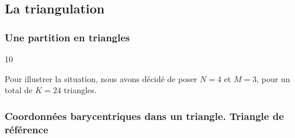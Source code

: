 \subsection{La triangulation}

\subsubsection{Une partition en triangles}

\begin{reponse}{10}

Pour illustrer la situation, nous avons décidé de poser $N=4$ et $M=3$, pour un total de $K=24$ triangles.

\begin{center}
\end{center}

\end{reponse}

\subsubsection{Coordonnées barycentriques dans un triangle. Triangle de référence}

